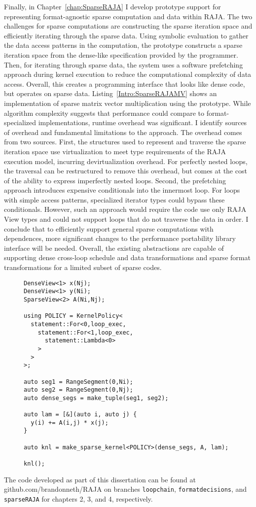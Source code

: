Finally, in Chapter~\ref{chap:SparseRAJA} I develop prototype support for representing format-agnostic sparse computation and data within RAJA\@.
The two challenges for sparse computations are constructing the sparse iteration space and efficiently iterating through the sparse data.
Using symbolic evaluation to gather the data access patterns in the computation, the prototype constructs a sparse iteration space from the dense-like specification provided by the programmer.
Then, for iterating through sparse data, the system uses a software prefetching approach during kernel execution to reduce the computational complexity of data access.
Overall, this creates a programming interface that looks like dense code, but operates on sparse data.
Listing~\ref{Intro:SparseRAJAMV} shows an implementation of sparse matrix vector multiplication using the prototype.
While algorithm complexity suggests that performance could compare to format-specialized implementations, runtime overhead was significant.
I identify sources of overhead and fundamental limitations to the approach.
The overhead comes from two sources.
First, the structures used to represent and traverse the sparse iteration space use virtualization to meet type requirements of the RAJA execution model, incurring devirtualization overhead.
For perfectly nested loops, the traversal can be restructured to remove this overhead, but comes at the cost of the ability to express imperfectly nested loops.
Second, the prefetching approach introduces expensive conditionals into the innermost loop.
For loops with simple access patterns, specialized iterator types could bypass these conditionals.
However, such an approach would require the code use only RAJA View types and could not support loops that do not traverse the data in order.
I conclude that to efficiently support general sparse computations with dependences, more significant changes to the performance portability library interface will be needed.
Overall, the existing abstractions are capable of supporting dense cross-loop schedule and data transformations and sparse format transformations for a limited subset of sparse codes.

\begin{figure}
\begin{lstlisting}[caption={Implementation of SpMV using the SparseRAJA prototype},label=Intro:SparseRAJAMV]
DenseView<1> x(Nj);
DenseView<1> y(Ni);
SparseView<2> A(Ni,Nj);

using POLICY = KernelPolicy<
  statement::For<0,loop_exec,
    statement::For<1,loop_exec,
      statement::Lambda<0>
    >
  >
>;

auto seg1 = RangeSegment(0,Ni);
auto seg2 = RangeSegment(0,Nj);
auto dense_segs = make_tuple(seg1, seg2);

auto lam = [&](auto i, auto j) {
  y(i) += A(i,j) * x(j);
}

auto knl = make_sparse_kernel<POLICY>(dense_segs, A, lam);
  
knl();
\end{lstlisting}
\end{figure}

The code developed as part of this dissertation can be found at github.com/brandonneth/RAJA on branches \verb.loopchain., \verb.formatdecisions., and \verb.sparseRAJA. for chapters 2, 3, and 4, respectively.
